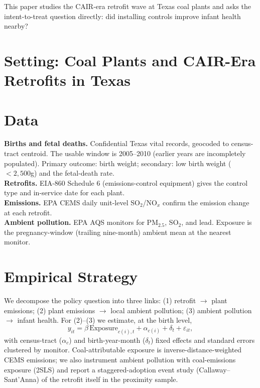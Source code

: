 \documentclass[12pt]{article}
\begin{document}
This paper studies the CAIR-era retrofit wave at Texas coal plants and asks the
intent-to-treat question directly: did installing controls improve infant health nearby?

\section{Setting: Coal Plants and CAIR-Era Retrofits in Texas}

\section{Data}
\textbf{Births and fetal deaths.} Confidential Texas vital records, geocoded to census-tract
centroid. The usable window is 2005--2010 (earlier years are incompletely populated). Primary
outcome: birth weight; secondary: low birth weight ($<2{,}500$g) and the fetal-death rate.\\
\textbf{Retrofits.} EIA-860 Schedule 6 (emissions-control equipment) gives the control type and
in-service date for each plant.\\
\textbf{Emissions.} EPA CEMS daily unit-level SO$_2$/NO$_x$ confirm the emission change at each
retrofit.\\
\textbf{Ambient pollution.} EPA AQS monitors for PM$_{2.5}$, SO$_2$, and lead. Exposure is the
pregnancy-window (trailing nine-month) ambient mean at the nearest monitor.

\section{Empirical Strategy}
We decompose the policy question into three links: (1) retrofit $\to$ plant emissions; (2) plant
emissions $\to$ local ambient pollution; (3) ambient pollution $\to$ infant health. For (2)--(3)
we estimate, at the birth level,
\[
y_{i t} = \beta\, \text{Exposure}_{c(i),t} + \alpha_{c(i)} + \delta_t + \varepsilon_{it},
\]
with census-tract ($\alpha_c$) and birth-year-month ($\delta_t$) fixed effects and standard
errors clustered by monitor. Coal-attributable exposure is inverse-distance-weighted CEMS
emissions; we also instrument ambient pollution with coal-emissions exposure (2SLS) and report a
staggered-adoption event study (Callaway--Sant'Anna) of the retrofit itself in the proximity sample.
\end{document}
